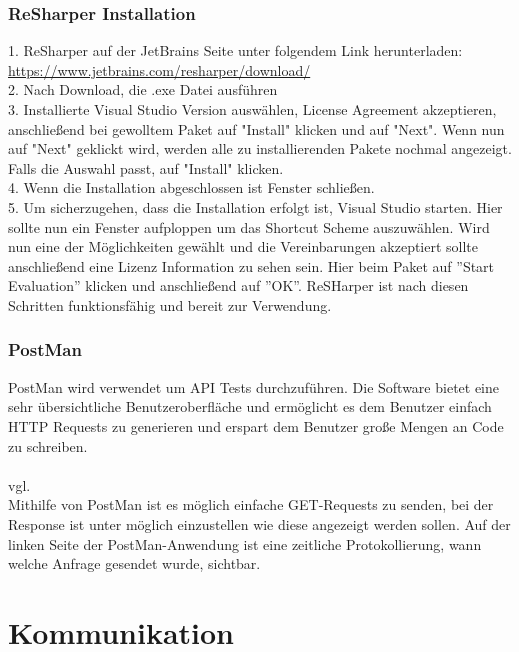 \subsubsection{ReSharper Installation}
\label{sec:ReSharperInstallation}
1. ReSharper auf der JetBrains Seite unter folgendem Link herunterladen: \break \url {https://www.jetbrains.com/resharper/download/} \\
2. Nach Download, die .exe Datei ausführen \\
3. Installierte Visual Studio Version auswählen, License Agreement akzeptieren, anschließend bei gewolltem Paket auf "Install" klicken und auf "Next". 
Wenn nun auf "Next" geklickt wird, werden alle zu installierenden Pakete nochmal angezeigt. Falls die Auswahl passt, auf "Install" klicken. \\
4. Wenn die Installation abgeschlossen ist Fenster schließen. \\
5. Um sicherzugehen, dass die Installation erfolgt ist, Visual Studio starten. Hier sollte nun ein Fenster aufploppen um das Shortcut Scheme auszuwählen.
Wird nun eine der Möglichkeiten gewählt und die Vereinbarungen akzeptiert sollte anschließend eine Lizenz Information zu sehen sein. Hier beim Paket auf ''Start Evaluation'' klicken und anschließend auf ''OK''. ReSHarper ist nach diesen Schritten funktionsfähig und bereit zur Verwendung.
\subsubsection {PostMan}
\label{sec:PostMan}
PostMan wird verwendet um API Tests durchzuführen. Die Software bietet eine sehr übersichtliche Benutzeroberfläche und ermöglicht es dem Benutzer einfach HTTP Requests zu generieren und erspart dem Benutzer große Mengen an Code zu schreiben. \\
\\vgl. \cite{TechnologiePostman} \\ \break
Mithilfe von PostMan ist es möglich einfache GET-Requests zu senden, bei der Response ist unter möglich einzustellen wie diese angezeigt werden sollen. Auf der linken Seite der PostMan-Anwendung ist eine zeitliche Protokollierung, wann welche Anfrage gesendet wurde, sichtbar.
\section{Kommunikation}
\label{sec:Kommunikation}
